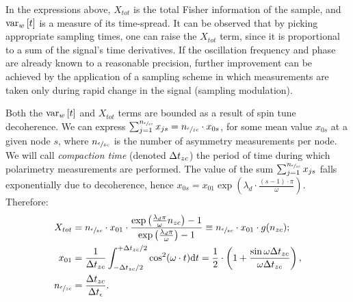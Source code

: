 \documentclass{article}
\newcommand{\td}{\mathrm{d}}
\newcommand{\meas}{\epsilon}
\newcommand{\dt}{\Delta t}
\newcommand{\dtm}{\dt_{\meas}}
\newcommand{\Nmnd}{{n_{\sfrac{\meas}{zc}}}}
\newcommand{\Nnd}{{n_{zc}}}
\newcommand{\lamd}{\lambda_d}
\begin{document}
In the expressions above, $X_{tot}$ is the total Fisher information of the sample, and $\var[w]{t}$ is a measure of its time-spread. It can be observed that by picking appropriate sampling times, one can raise the $X_{tot}$ term, since it is proportional to a sum of the signal's time derivatives. If the oscillation frequency and phase are already known to a reasonable precision, further improvement can be achieved by the application of a sampling scheme in which measurements are taken only during rapid change in the signal (sampling modulation).

Both the $\var[w]{t}$ and $X_{tot}$ terms are bounded as a result of spin tune decoherence. We can express $\sum_{j=1}^{\Nmnd} x_{js} = \Nmnd \cdot x_{0s}$, for some mean value $x_{0s}$ at a given node $s$, where $\Nmnd$ is the number of asymmetry measurements per node. We will call \emph{compaction time} (denoted $\dtnd$) the period of time during which polarimetry measurements are performed. The value of the sum $\sum_{j=1}^{\Nmnd} x_{js}$ falls exponentially due to decoherence, hence $x_{0s} = x_{01}\exp{(\lamd\cdot \frac{(s-1)\cdot\pi}{\omega})}$. Therefore:
\begin{align}
	X_{tot} & = \Nmnd\cdot x_{01} \cdot \frac{\exp{\bkt{\frac{\lamd\pi}{\omega}\Nnd}}-1}{\exp{\bkt{\frac{\lamd\pi}{\omega}}}-1} 
	\equiv \Nmnd \cdot x_{01}\cdot g(\Nnd); \label{eq:FItot}\\
	x_{01}  & = \frac{1}{\dtnd}\int_{-\dtnd/2}^{+\dtnd/2}\cos^2(\omega\cdot t)\td t = \frac12\cdot \bkt{1 + \frac{\sin\omega\dtnd}{\omega\dtnd}},                                    \label{eq:MeanFIZC}   \\
	\Nmnd   & = \frac{\dtnd}{\dtm}. \label{eq:NumMeasNode}
\end{align}
\end{document}
